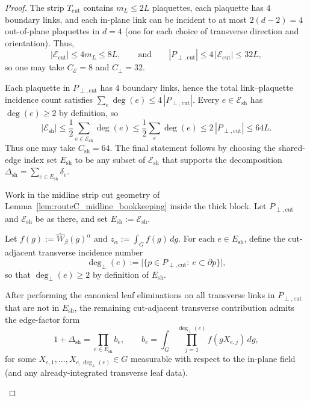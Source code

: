 \begin{proof}
The strip $T_{\mathrm{cut}}$ contains $m_L\le 2L$ plaquettes, each plaquette has $4$ boundary links, and each in-plane link can be incident
to at most $2(d-2)=4$ out-of-plane plaquettes in $d=4$ (one for each choice of transverse direction and orientation).
Thus,
\[
|\mathcal E_{\mathrm{cut}}|
\le 4 m_L
\le 8L,
\qquad\text{and}\qquad
|P_{\perp,\mathrm{cut}}|
\le 4\,|\mathcal E_{\mathrm{cut}}|
\le 32L,
\]
so one may take $C_{\mathcal E}=8$ and $C_{\perp}=32$.

Each plaquette in $P_{\perp,\mathrm{cut}}$ has $4$ boundary links, hence the total link--plaquette incidence count satisfies
$\sum_{e} \deg(e) \le 4\,|P_{\perp,\mathrm{cut}}|$.
Every $e\in\mathcal E_{\mathrm{sh}}$ has $\deg(e)\ge 2$ by definition, so
\[
|\mathcal E_{\mathrm{sh}}|
\le \frac12\sum_{e\in\mathcal E_{\mathrm{sh}}}\deg(e)
\le \frac12\sum_{e}\deg(e)
\le 2\,|P_{\perp,\mathrm{cut}}|
\le 64L.
\]
Thus one may take $C_{\mathrm{sh}}=64$.
The final statement follows by choosing the shared-edge index set $E_{\mathrm{sh}}$ to be any subset of $\mathcal E_{\mathrm{sh}}$
that supports the decomposition $\Delta_{\mathrm{sh}}=\sum_{e\in E_{\mathrm{sh}}}\delta_e$.


\begin{lemma}\label{lem:routeC_shared_edge_product_midline}
Work in the midline strip cut geometry of Lemma~\ref{lem:routeC_midline_bookkeeping} inside the thick block.
Let $P_{\perp,\mathrm{cut}}$ and $\mathcal E_{\mathrm{sh}}$ be as there, and set $E_{\mathrm{sh}}:=\mathcal E_{\mathrm{sh}}$.

Let $f(g):=\widehat W_{\beta}(g)^{\alpha}$ and $z_\alpha:=\int_G f(g)\,dg$.
For each $e\in E_{\mathrm{sh}}$, define the cut-adjacent transverse incidence number
\[
\deg_{\perp}(e):=\bigl|\{p\in P_{\perp,\mathrm{cut}}:\ e\subset \partial p\}\bigr|,
\]
so that $\deg_{\perp}(e)\ge 2$ by definition of $E_{\mathrm{sh}}$.

After performing the canonical leaf eliminations on all transverse links in $P_{\perp,\mathrm{cut}}$ that are not in $E_{\mathrm{sh}}$,
the remaining cut-adjacent transverse contribution admits the edge-factor form
\begin{equation}\label{eq:routeC_shared_edge_product_form_midline}
1+\Delta_{\mathrm{sh}}
=
\prod_{e\in E_{\mathrm{sh}}} b_e,
\qquad
b_e = \int_G \prod_{j=1}^{\deg_\perp(e)} f(g X_{e,j})\,dg,
\end{equation}
for some $X_{e,1},\dots,X_{e,\deg_\perp(e)}\in G$ measurable with respect to the in-plane field (and any already-integrated transverse leaf data).


\end{lemma}
\end{proof}
